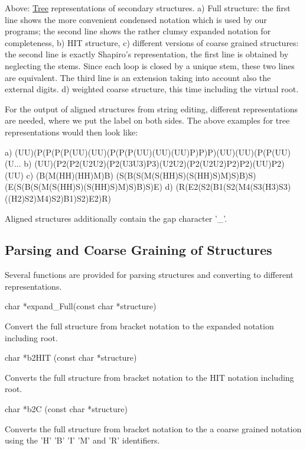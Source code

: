 Above: \hyperlink{structTree}{Tree} representations of secondary structures. a) Full structure: the first line shows the more convenient condensed notation which is used by our programs; the second line shows the rather clumsy expanded notation for completeness, b) HIT structure, c) different versions of coarse grained structures: the second line is exactly Shapiro's representation, the first line is obtained by neglecting the stems. Since each loop is closed by a unique stem, these two lines are equivalent. The third line is an extension taking into account also the external digits. d) weighted coarse structure, this time including the virtual root.

For the output of aligned structures from string editing, different representations are needed, where we put the label on both sides. The above examples for tree representations would then look like:

\begin{DoxyVerb}
a) (UU)(P(P(P(P(UU)(UU)(P(P(P(UU)(UU)(UU)P)P)P)(UU)(UU)(P(P(UU)(U...
b) (UU)(P2(P2(U2U2)(P2(U3U3)P3)(U2U2)(P2(U2U2)P2)P2)(UU)P2)(UU)
c) (B(M(HH)(HH)M)B)
   (S(B(S(M(S(HH)S)(S(HH)S)M)S)B)S)
   (E(S(B(S(M(S(HH)S)(S(HH)S)M)S)B)S)E)
d) (R(E2(S2(B1(S2(M4(S3(H3)S3)((H2)S2)M4)S2)B1)S2)E2)R)
\end{DoxyVerb}


Aligned structures additionally contain the gap character '\_\-'.

\subsection*{Parsing and Coarse Graining of Structures}

Several functions are provided for parsing structures and converting to different representations.

\begin{DoxyVerb}
char  *expand_Full(const char *structure)
\end{DoxyVerb}
 Convert the full structure from bracket notation to the expanded notation including root. 

\begin{DoxyVerb}
char *b2HIT (const char *structure)
\end{DoxyVerb}
 Converts the full structure from bracket notation to the HIT notation including root. 

\begin{DoxyVerb}
char *b2C (const char *structure)
\end{DoxyVerb}
 Converts the full structure from bracket notation to the a coarse grained notation using the 'H' 'B' 'I' 'M' and 'R' identifiers. 

